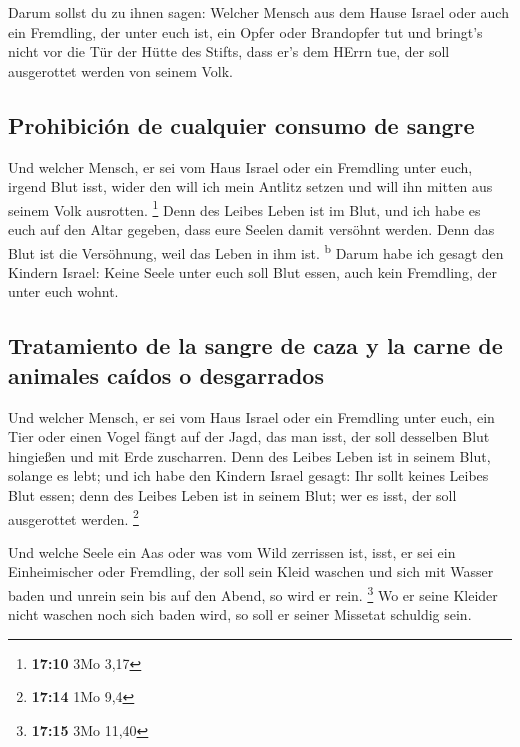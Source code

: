  Darum sollst du zu ihnen sagen: Welcher Mensch aus dem
Hause Israel oder auch ein Fremdling, der unter euch ist, ein Opfer oder
Brandopfer tut  und bringt's nicht vor die Tür der Hütte
des Stifts, dass er's dem HErrn tue, der soll ausgerottet werden von
seinem Volk.

\hypertarget{prohibiciuxf3n-de-cualquier-consumo-de-sangre}{%
\subsection{Prohibición de cualquier consumo de
sangre}\label{prohibiciuxf3n-de-cualquier-consumo-de-sangre}}

 Und welcher Mensch, er sei vom Haus Israel oder ein
Fremdling unter euch, irgend Blut isst, wider den will ich mein Antlitz
setzen und will ihn mitten aus seinem Volk ausrotten. \footnote{\textbf{17:10}
  3Mo 3,17}  Denn des Leibes Leben ist im Blut, und ich
habe es euch auf den Altar gegeben, dass eure Seelen damit versöhnt
werden. Denn das Blut ist die Versöhnung, weil das Leben in ihm ist.
\textsuperscript{b}  Darum habe ich gesagt den Kindern
Israel: Keine Seele unter euch soll Blut essen, auch kein Fremdling, der
unter euch wohnt.

\hypertarget{tratamiento-de-la-sangre-de-caza-y-la-carne-de-animales-cauxeddos-o-desgarrados}{%
\subsection{Tratamiento de la sangre de caza y la carne de animales
caídos o
desgarrados}\label{tratamiento-de-la-sangre-de-caza-y-la-carne-de-animales-cauxeddos-o-desgarrados}}

 Und welcher Mensch, er sei vom Haus Israel oder ein
Fremdling unter euch, ein Tier oder einen Vogel fängt auf der Jagd, das
man isst, der soll desselben Blut hingießen und mit Erde zuscharren.
 Denn des Leibes Leben ist in seinem Blut, solange es
lebt; und ich habe den Kindern Israel gesagt: Ihr sollt keines Leibes
Blut essen; denn des Leibes Leben ist in seinem Blut; wer es isst, der
soll ausgerottet werden. \footnote{\textbf{17:14} 1Mo 9,4}

 Und welche Seele ein Aas oder was vom Wild zerrissen
ist, isst, er sei ein Einheimischer oder Fremdling, der soll sein Kleid
waschen und sich mit Wasser baden und unrein sein bis auf den Abend, so
wird er rein. \footnote{\textbf{17:15} 3Mo 11,40}  Wo er
seine Kleider nicht waschen noch sich baden wird, so soll er seiner
Missetat schuldig sein.

